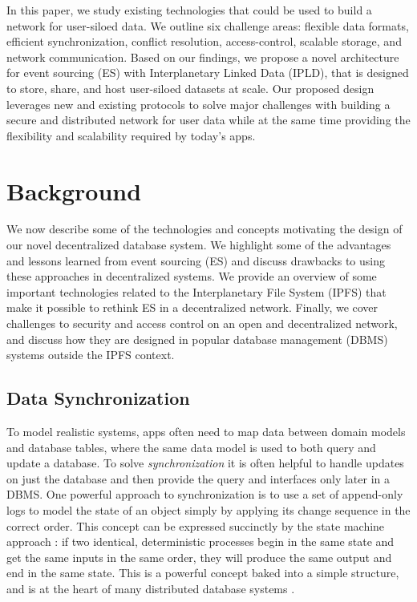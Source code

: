 \documentclass{textile}
\begin{document}
In this paper, we study existing technologies that could be used to build a network for user-siloed data. We outline six challenge areas: flexible data formats, efficient synchronization, conflict resolution, access-control, scalable storage, and network communication. Based on our findings, we propose a novel architecture for event sourcing (ES) with Interplanetary Linked Data (IPLD), that is designed to store, share, and host user-siloed datasets at scale. Our proposed design leverages new and existing protocols to solve major challenges with building a secure and distributed network for user data while at the same time providing the flexibility and scalability required by today's apps. 


\section{Background}\label{sec:Background}

We now describe some of the technologies and concepts motivating the design of our novel decentralized database system. We highlight some of the advantages and lessons learned from event sourcing (ES) and discuss drawbacks to using these approaches in decentralized systems. We provide an overview of some important technologies related to the Interplanetary File System (IPFS) that make it possible to rethink ES in a decentralized network. Finally, we cover challenges to security and access control on an open and decentralized network, and discuss how they are designed in popular database management (DBMS) systems outside the IPFS context.

\subsection{Data Synchronization}

To model realistic systems, apps often need to map data between domain models and database tables, where the same data model is used to both query and update a database. To solve \emph{synchronization} it is often helpful to handle updates on just the database and then provide the query and interfaces only later in a DBMS. One powerful approach to synchronization is to use a set of append-only logs to model the state of an object simply by applying its change sequence in the correct order. This concept can be expressed succinctly by the state machine approach \cite{schneiderImplementingFaulttolerantServices1990}: if two identical, deterministic processes begin in the same state and get the same inputs in the same order, they will produce the same output and end in the same state. This is a powerful concept baked into a simple structure, and is at the heart of many distributed database systems \cite{jaykrepsLogWhatEvery2013}.
\end{document}
